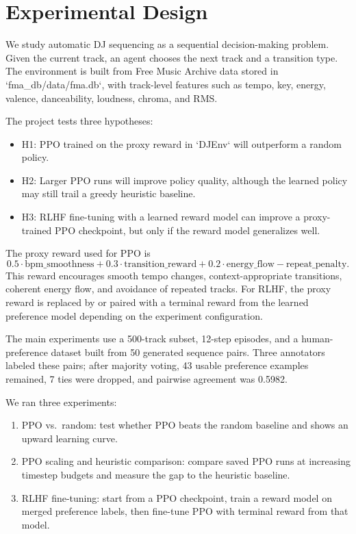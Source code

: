 \documentclass{article}
\begin{document}
\section{Experimental Design}

We study automatic DJ sequencing as a sequential decision-making problem. Given the current track, an agent chooses the next track and a transition type. The environment is built from Free Music Archive data stored in `fma\_db/data/fma.db`, with track-level features such as tempo, key, energy, valence, danceability, loudness, chroma, and RMS.

The project tests three hypotheses:
\begin{itemize}
\item H1: PPO trained on the proxy reward in `DJEnv` will outperform a random policy.
\item H2: Larger PPO runs will improve policy quality, although the learned policy may still trail a greedy heuristic baseline.
\item H3: RLHF fine-tuning with a learned reward model can improve a proxy-trained PPO checkpoint, but only if the reward model generalizes well.
\end{itemize}

The proxy reward used for PPO is
\[
0.5 \cdot \text{bpm\_smoothness} + 0.3 \cdot \text{transition\_reward} + 0.2 \cdot \text{energy\_flow} - \text{repeat\_penalty}.
\]
This reward encourages smooth tempo changes, context-appropriate transitions, coherent energy flow, and avoidance of repeated tracks. For RLHF, the proxy reward is replaced by or paired with a terminal reward from the learned preference model depending on the experiment configuration.

The main experiments use a 500-track subset, 12-step episodes, and a human-preference dataset built from 50 generated sequence pairs. Three annotators labeled these pairs; after majority voting, 43 usable preference examples remained, 7 ties were dropped, and pairwise agreement was 0.5982.

We ran three experiments:
\begin{enumerate}
\item PPO vs.\ random: test whether PPO beats the random baseline and shows an upward learning curve.
\item PPO scaling and heuristic comparison: compare saved PPO runs at increasing timestep budgets and measure the gap to the heuristic baseline.
\item RLHF fine-tuning: start from a PPO checkpoint, train a reward model on merged preference labels, then fine-tune PPO with terminal reward from that model.
\end{enumerate}
\end{document}

